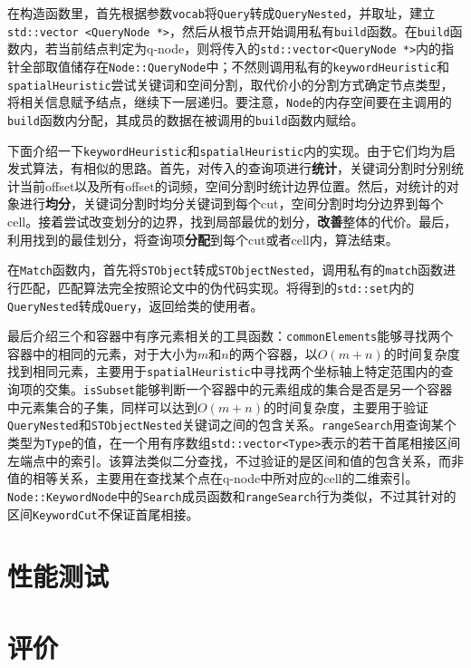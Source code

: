 \documentclass[UTF8]{ctexart}
\begin{document}
在构造函数里，首先根据参数\texttt{vocab}将\texttt{Query}转成\texttt{QueryNested}，并取址，建立\texttt{std::vector <QueryNode *>}，然后从根节点开始调用私有\texttt{build}函数。在\texttt{build}函数内，若当前结点判定为q-node，则将传入的\texttt{std::vector<QueryNode *>}内的指针全部取值储存在\texttt{Node::QueryNode}中；不然则调用私有的\texttt{keywordHeuristic}和\texttt{spatialHeuristic}尝试关键词和空间分割，取代价小的分割方式确定节点类型，将相关信息赋予结点，继续下一层递归。要注意，\texttt{Node}的内存空间要在主调用的\texttt{build}函数内分配，其成员的数据在被调用的\texttt{build}函数内赋给。

下面介绍一下\texttt{keywordHeuristic}和\texttt{spatialHeuristic}内的实现。由于它们均为启发式算法，有相似的思路。首先，对传入的查询项进行\textbf{统计}，关键词分割时分别统计当前offset以及所有offset的词频，空间分割时统计边界位置。然后，对统计的对象进行\textbf{均分}，关键词分割时均分关键词到每个cut，空间分割时均分边界到每个cell。接着尝试改变划分的边界，找到局部最优的划分，\textbf{改善}整体的代价。最后，利用找到的最佳划分，将查询项\textbf{分配}到每个cut或者cell内，算法结束。

在\texttt{Match}函数内，首先将\texttt{STObject}转成\texttt{STObjectNested}，调用私有的\texttt{match}函数进行匹配，匹配算法完全按照论文中的伪代码实现。将得到的\texttt{std::set}内的\texttt{QueryNested}转成\texttt{Query}，返回给类的使用者。

最后介绍三个和容器中有序元素相关的工具函数：\texttt{commonElements}能够寻找两个容器中的相同的元素，对于大小为$m$和$n$的两个容器，以$O(m+n)$的时间复杂度找到相同元素，主要用于\texttt{spatialHeuristic}中寻找两个坐标轴上特定范围内的查询项的交集。\texttt{isSubset}能够判断一个容器中的元素组成的集合是否是另一个容器中元素集合的子集，同样可以达到$O(m+n)$的时间复杂度，主要用于验证\texttt{QueryNested}和\texttt{STObjectNested}关键词之间的包含关系。\texttt{rangeSearch}用查询某个类型为\texttt{Type}的值，在一个用有序数组\texttt{std::vector<Type>}表示的若干首尾相接区间左端点中的索引。该算法类似二分查找，不过验证的是区间和值的包含关系，而非值的相等关系，主要用在查找某个点在q-node中所对应的cell的二维索引。\texttt{Node::KeywordNode}中的\texttt{Search}成员函数和\texttt{rangeSearch}行为类似，不过其针对的区间\texttt{KeywordCut}不保证首尾相接。

\section{性能测试}


\section{评价}
\end{document}
